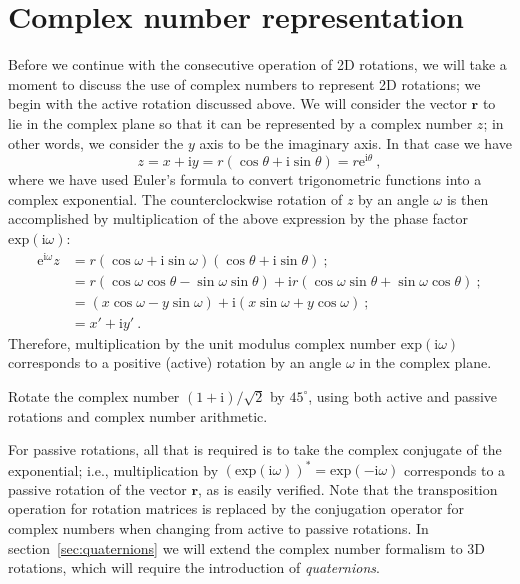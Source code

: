 \section{Complex number representation}\label{\chabbr:sec:complex2D}
Before we continue with the consecutive operation of 2D rotations, we will take a moment to discuss the use of complex numbers to represent 2D rotations; we begin with the active rotation discussed above.  We will consider the vector $\mathbf{r}$ to lie in the complex plane so that it can be represented by a complex number $z$; in other words, we consider the $y$ axis to be the imaginary axis.  In that case we have 
\[
	z = x+\mathrm{i}y = r(\cos\theta+\mathrm{i}\sin\theta) = r \mathrm{e}^{\mathrm{i}\theta}\ ,
\]
where we have used Euler's formula to convert trigonometric functions into a complex exponential.  The counterclockwise rotation of $z$ by an angle $\omega$ is then accomplished by multiplication of the above expression by the phase factor $\text{exp}(\mathrm{i}\omega)$:
\begin{align*}
	\mathrm{e}^{\mathrm{i}\omega}z &=  r(\cos\omega+\mathrm{i}\sin\omega) (\cos\theta+\mathrm{i}\sin\theta)\ ; \\
	&=r(\cos\omega\cos\theta - \sin\omega\sin\theta) +\mathrm{i}r(\cos\omega\sin\theta+\sin\omega\cos\theta)\ ; \\
	&= (x\cos\omega - y\sin\omega) + \mathrm{i} (x\sin\omega + y\cos\omega)\ ; \\
	& = x' + \mathrm{i} y'\ .
\end{align*}
Therefore, multiplication by the unit modulus complex number $\text{exp}(\mathrm{i}\omega)$ corresponds to a positive (active) rotation by an angle $\omega$ in the complex plane.

\begin{exercise}
Rotate the complex number $(1+\mathrm{i})/\sqrt{2}$ by $45^{\circ}$, using both active and passive rotations and complex number arithmetic.
\end{exercise}

For passive rotations, all that is required is to take the complex conjugate of the exponential; i.e., multiplication by $\left(\text{exp}(\mathrm{i}\omega)\right)^{\ast}=\text{exp}(-\mathrm{i}\omega)$ corresponds to a passive rotation of the vector $\mathbf{r}$, as is easily verified.  Note that the transposition operation for rotation matrices is replaced by the conjugation operator for complex numbers when changing from active to passive rotations.  In section~\ref{sec:quaternions} we will extend the complex number formalism to 3D rotations, which will require the introduction of  \textit{quaternions}.

